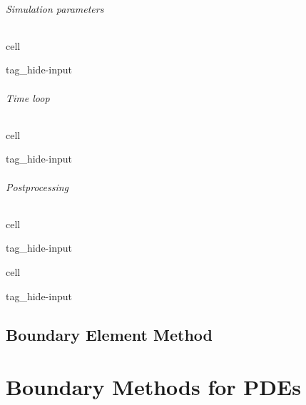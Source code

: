 \documentclass[letterpaper,10pt,english]{jupyterBook}
\begin{document}
\paragraph{Simulation parameters}
\label{\detokenize{ch/pde/euler-1d-ale-piston:simulation-parameters}}
\begin{sphinxuseclass}{cell}
\begin{sphinxuseclass}{tag_hide-input}
\end{sphinxuseclass}
\end{sphinxuseclass}

\paragraph{Time loop}
\label{\detokenize{ch/pde/euler-1d-ale-piston:time-loop}}
\begin{sphinxuseclass}{cell}
\begin{sphinxuseclass}{tag_hide-input}
\end{sphinxuseclass}
\end{sphinxuseclass}

\paragraph{Post\sphinxhyphen{}processing}
\label{\detokenize{ch/pde/euler-1d-ale-piston:post-processing}}
\begin{sphinxuseclass}{cell}
\begin{sphinxuseclass}{tag_hide-input}
\end{sphinxuseclass}
\end{sphinxuseclass}
\begin{sphinxuseclass}{cell}
\begin{sphinxuseclass}{tag_hide-input}
\end{sphinxuseclass}
\end{sphinxuseclass}
\sphinxstepscope


\chapter{Boundary Element Method}
\label{\detokenize{ch/pde/bem:boundary-element-method}}\label{\detokenize{ch/pde/bem:pdf-bem}}\label{\detokenize{ch/pde/bem::doc}}
\sphinxstepscope


\part{Boundary Methods for PDEs}
\end{document}
